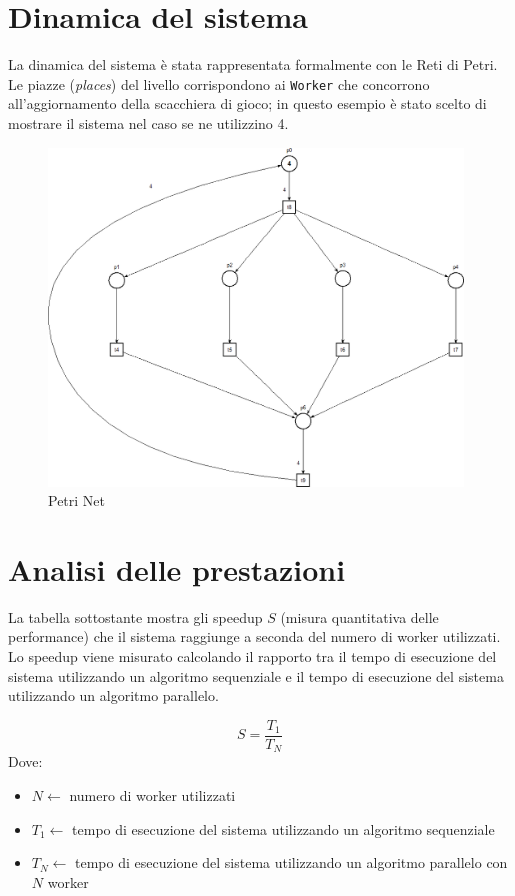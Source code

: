 \documentclass[a4paper]{article}
\begin{document}
\section{Dinamica del sistema}\label{dinamica-del-sistema}
La dinamica del sistema è stata rappresentata formalmente con le Reti di Petri. Le piazze (\textit{places}) del livello corrispondono ai \texttt{Worker} che concorrono all'aggiornamento della scacchiera di gioco; in questo esempio è stato scelto di mostrare il sistema nel caso se ne utilizzino 4.
\begin{figure}[H]
    \centering
    \includegraphics[width=110mm]{res/reti_di_petri_assigment1.png}
    \caption{Petri Net}
    \label{fig:petrinets}
\end{figure}

\section{Analisi delle prestazioni}\label{analisi-delle-prestazioni}
La tabella sottostante mostra gli speedup $S$ (misura quantitativa delle performance) che il sistema raggiunge a seconda del numero di worker utilizzati.\\
Lo speedup viene misurato calcolando il rapporto tra il tempo di esecuzione del sistema utilizzando un algoritmo sequenziale e il tempo di esecuzione del sistema utilizzando un algoritmo parallelo.

\begin{equation}
 S = \frac{T_1}{T_N}
\end{equation}
Dove:
\begin{itemize}
    \item $N \leftarrow$ numero di worker utilizzati
    \item $T_1 \leftarrow$ tempo di esecuzione del sistema utilizzando un algoritmo sequenziale
    \item $T_N \leftarrow$ tempo di esecuzione del sistema utilizzando un algoritmo parallelo con $N$ worker
\end{itemize}
\end{document}
